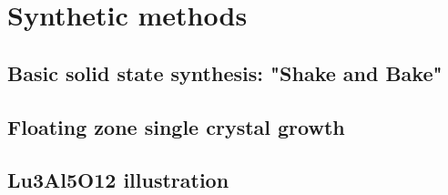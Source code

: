 \chapter{Synthetic methods} \label{chap:chap-2}





\section{Basic solid state synthesis: "Shake and Bake"}

\section{Floating zone single crystal growth}

\section{Lu3Al5O12 illustration}
